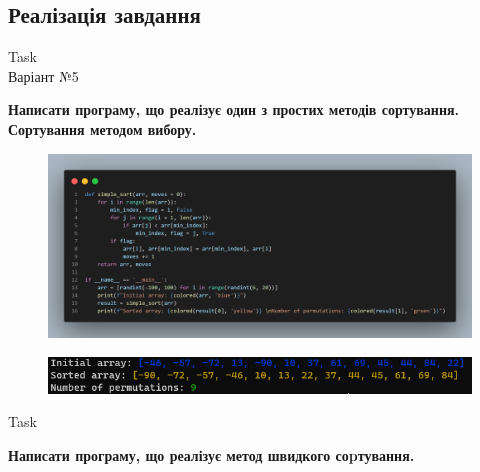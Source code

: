 \documentclass[a4paper,12pt]{article}
\newcommand{\RomanNumeralCaps}[1]{\MakeUppercase{\romannumeral #1}}
\begin{document}
\newpage
    \begin{center}
        \section*{\bfseries{Реалізація завдання}}
    \end{center}
    \begin{center}
        \Large{Task \RomanNumeralCaps{1}} \\
        \Large{Варіант №5}
    \end{center}
    \textbf{Написати програму, що реалізує один з простих методів сортування.
    Сортування методом вибору.}
    \begin{figure}[h!]
        \begin{minipage}[h]{1\linewidth}
            \centering
            \includegraphics[width=1\linewidth]{Prt sc/Figure_1.png}  
        \end{minipage}
    \end{figure}
    \begin{figure}[h!]
        \begin{minipage}[h]{1\linewidth}
            \centering
            \includegraphics[width=1\linewidth]{Prt sc/Figure_2.png}
        \end{minipage}
    \end{figure}

    \begin{center}
        \Large{Task \RomanNumeralCaps{2}}
    \end{center}
    \textbf{Написати програму, що реалізує метод швидкого соpтування.}
    
\end{document}
